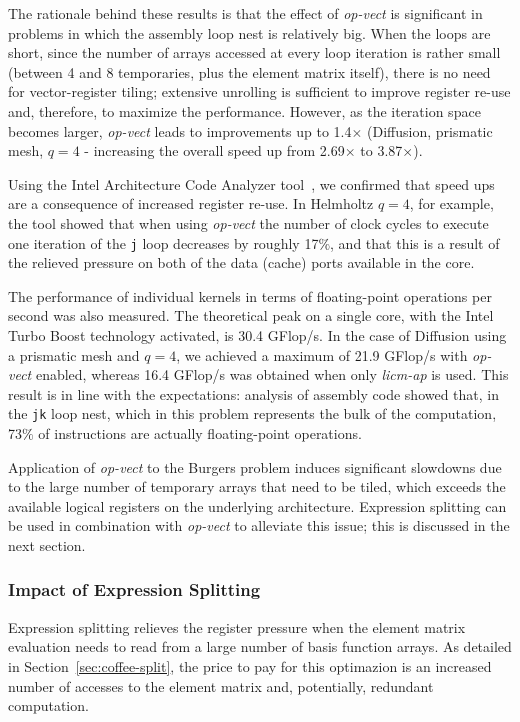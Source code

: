 The rationale behind these results is that the effect of \emph{op-vect} is significant in problems in which the assembly loop nest is relatively big. When the loops are short, since the number of arrays accessed at every loop iteration is rather small (between 4 and 8 temporaries, plus the element matrix itself), there is no need for
vector-register tiling; extensive unrolling is sufficient to improve register re-use and, therefore, to maximize the performance. However, as the iteration space becomes larger, \emph{op-vect} leads to improvements up to 1.4$\times$ (Diffusion, prismatic mesh, $q=4$ - increasing the overall speed up from 2.69$\times$ to 3.87$\times$).

Using the Intel Architecture Code Analyzer tool~\cite{IACA}, we confirmed that speed ups are a consequence of increased register re-use. In Helmholtz $q=4$, for example, the tool showed that when using \emph{op-vect} the number of clock cycles to execute one iteration of the \texttt{j} loop decreases by roughly 17$\%$, and that this is a result of the relieved pressure on both of the data (cache) ports available in the core.

The performance of individual kernels in terms of floating-point operations per second was also measured. The theoretical peak on a single core, with the Intel Turbo Boost technology activated, is 30.4 GFlop/s. In the case of Diffusion using a prismatic mesh and $q=4$, we achieved a maximum of 21.9 GFlop/s with \emph{op-vect} enabled, whereas 16.4 GFlop/s was obtained when only \emph{licm-ap} is used. This result is in line with the expectations: analysis of assembly code showed that, in the \texttt{jk} loop nest, which in this problem represents the bulk of the computation, 73$\%$ of instructions are actually floating-point operations.

Application of \emph{op-vect} to the Burgers problem induces significant slowdowns due to the large number of temporary arrays that need to be tiled, which exceeds the available logical registers on the underlying architecture. Expression splitting can be used in combination with \emph{op-vect} to alleviate this issue; this is discussed in the next section.


\subsubsection{Impact of Expression Splitting}
\label{sec:perf-results-split} 
Expression splitting relieves the register pressure when the element matrix evaluation needs to read from a large number of basis function arrays. As detailed in Section~\ref{sec:coffee-split}, the price to pay for this optimazion is an increased number of accesses to the element matrix and, potentially, redundant computation. 

